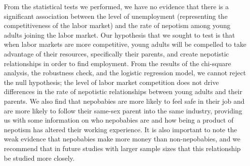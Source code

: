 \documentclass[12pt]{article}
\begin{document}
From the statistical tests we performed, we have no evidence that there is a significant association between the level of unemployment (representing the competitiveness of the labor market) and the rate of nepotism among young adults joining the labor market. Our hypothesis that we sought to test is that when labor markets are more competitive, young adults will be compelled to take advantage of their resources, specifically their parents, and create nepotistic relationships in order to find employment. From the results of the chi-square analysis, the robustness check, and the logistic regression model, we cannot reject the null hypothesis; the level of labor market competition does not drive differences in the rate of nepotistic relationships between young adults and their parents. We also find that nepobabies are more likely to feel safe in their job and are more likely to follow their same-sex parent into the same industry, providing us with some information on who nepobabies are and how being a product of nepotism has altered their working experience. It is also important to note the weak evidence that nepobabies make more money than non-nepobabies, and we recommend that in future studies with larger sample sizes that this relationship be studied more closely.
\end{document}
